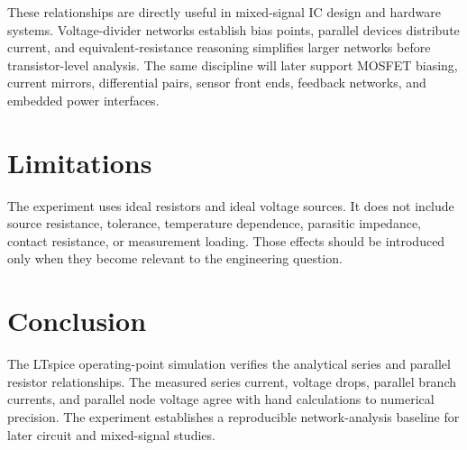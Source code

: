 \documentclass[11pt,a4paper]{article}
\begin{document}
These relationships are directly useful in mixed-signal IC design and hardware systems. Voltage-divider networks establish bias points, parallel devices distribute current, and equivalent-resistance reasoning simplifies larger networks before transistor-level analysis. The same discipline will later support MOSFET biasing, current mirrors, differential pairs, sensor front ends, feedback networks, and embedded power interfaces.

\section{Limitations}

The experiment uses ideal resistors and ideal voltage sources. It does not include source resistance, tolerance, temperature dependence, parasitic impedance, contact resistance, or measurement loading. Those effects should be introduced only when they become relevant to the engineering question.

\section{Conclusion}

The LTspice operating-point simulation verifies the analytical series and parallel resistor relationships. The measured series current, voltage drops, parallel branch currents, and parallel node voltage agree with hand calculations to numerical precision. The experiment establishes a reproducible network-analysis baseline for later circuit and mixed-signal studies.

\nocite{analogdevices_ltspice,sedra_smith}
\printbibliography
\end{document}
